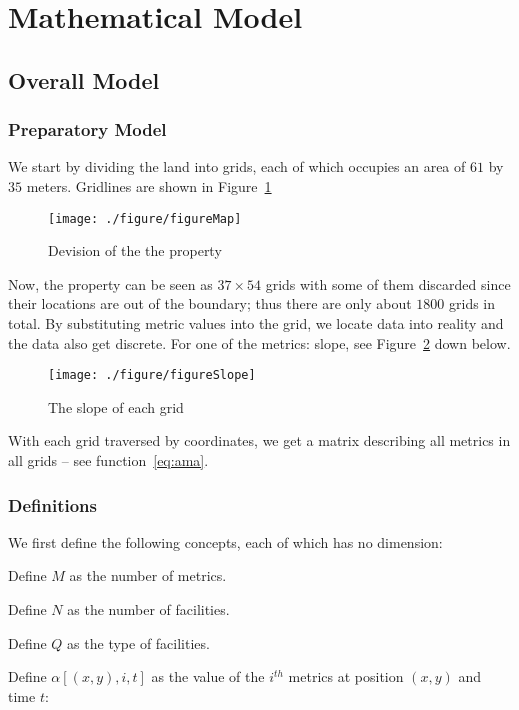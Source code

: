 \documentclass[./main.tex]{subfiles}
\begin{document}
\section{Mathematical Model}
\subsection{Overall Model}
    \subsubsection{Preparatory Model}
    We start by dividing the land into grids, each of which occupies an area of $61$ by $35$ meters.
    Gridlines are shown in Figure~\ref{fig:figureMD}

    \begin{figure}[H]
        \centering
        \texttt{[image: ./figure/figureMap]}
        \caption{Devision of the the property}
        \label{fig:figureMD}
    \end{figure}

    Now, the property can be seen as $37 \times 54$ grids with some of them discarded since their locations are out of
    the boundary; thus there are only about $1800$ grids in total.
    By substituting metric values into the grid, we locate data into reality and the data also get discrete.
    For one of the metrics: slope, see Figure~\ref{fig:figureSlope} down below.


\begin{figure}[H]
    \centering
    \texttt{[image: ./figure/figureSlope]}
    \caption{The slope of each grid}
    \label{fig:figureSlope}
\end{figure}


    With each grid traversed by coordinates, we get a matrix describing all metrics in all grids -- see function~\eqref{eq:ama}.


    \subsubsection{Definitions}
        We first define the following concepts, each of which has no dimension:

        Define $M$ as the number of metrics.

        Define $N$ as the number of facilities.

        Define $Q$ as the type of facilities.

        Define $\alpha\left[\left( x , y \right), i , t \right]$ as the value of the $i^{th}$ metrics at position $\left(
x,y \right)$ and time $t$:
\end{document}
